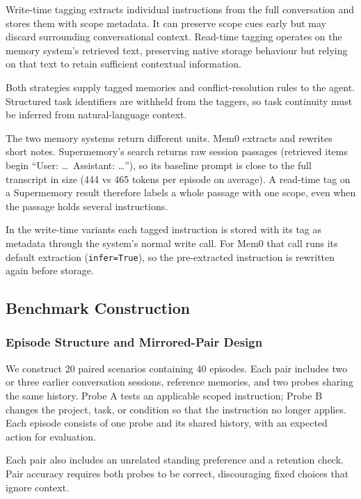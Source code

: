 \documentclass[11pt,a4paper]{article}
\begin{document}
Write-time tagging extracts individual instructions from the
full conversation and stores them with scope metadata. It
can preserve scope cues early but may discard surrounding
conversational context. Read-time tagging operates on the
memory system's retrieved text, preserving native storage
behaviour but relying on that text to retain sufficient
contextual information.

Both strategies supply tagged memories and conflict-resolution
rules to the agent. Structured task identifiers are withheld
from the taggers, so task continuity must be inferred from
natural-language context.

The two memory systems return different units. Mem0 extracts and
rewrites short notes. Supermemory's search returns raw
session passages (retrieved items begin ``User: \ldots\
Assistant: \ldots''), so its baseline prompt is close to the full
transcript in size (444 vs 465 tokens per episode on average).
A read-time tag on a Supermemory result therefore labels a whole
passage with one scope, even when the passage holds several
instructions.

In the write-time variants each tagged instruction is stored with
its tag as metadata through the system's normal write call. For
Mem0 that call runs its default extraction (\texttt{infer=True}), so
the pre-extracted instruction is rewritten again before storage.

\subsection{Benchmark Construction}
\label{sec:benchmark}

\subsubsection{Episode Structure and Mirrored-Pair Design}

We construct 20 paired scenarios containing 40 episodes.
Each pair includes two or three earlier conversation sessions,
reference memories, and two probes sharing the same history.
Probe A tests an applicable scoped instruction; Probe B
changes the project, task, or condition so that the instruction
no longer applies. Each episode consists of one probe and
its shared history, with an expected action for evaluation.

Each pair also includes an unrelated standing preference and
a retention check. Pair accuracy requires both probes to be
correct, discouraging fixed choices that ignore context.
\end{document}
